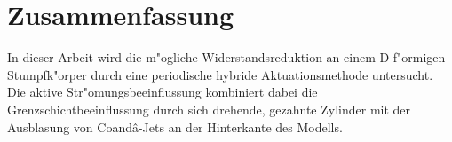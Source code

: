 \chapter*{Zusammenfassung}\label{s:uebersicht}

In dieser Arbeit wird die m"ogliche Widerstandsreduktion an einem D-f"ormigen Stumpfk"orper durch eine periodische hybride Aktuationsmethode untersucht.
Die aktive Str"omungsbeeinflussung kombiniert dabei die Grenzschichtbeeinflussung durch sich drehende, gezahnte Zylinder mit der Ausblasung von Coand\^{a}-Jets an der Hinterkante des Modells.


